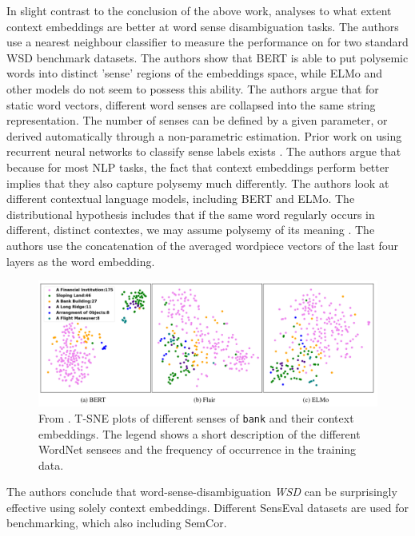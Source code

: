 \documentclass[a4paper,12pt,twoside,openright]{report}
\begin{document}
In slight contrast to the conclusion of the above work, \cite{wiedmann19} analyses to what extent context embeddings are better at word sense disambiguation tasks.
The authors use a nearest neighbour classifier to measure the performance on  for two standard WSD benchmark datasets.
The authors show that BERT is able to put polysemic words into distinct 'sense' regions of the embeddings space, while ELMo and other models do not seem to possess this ability.
The authors argue that for static word vectors, different word senses are collapsed into the same string representation.
The number of senses can be defined by a given parameter, or derived automatically through a non-parametric estimation.
Prior work on using recurrent neural networks to classify sense labels exists \cite{kageback16}.
The authors argue that because for most NLP tasks, the fact that context embeddings perform better implies that they also capture polysemy much differently.
The authors look at different contextual language models, including BERT and ELMo.
The distributional hypothesis includes that if the same word regularly occurs in different, distinct contextes, we may assume polysemy of its meaning \cite{miller91}.
The authors use the concatenation of the averaged wordpiece vectors of the last four layers as the word embedding.

\begin{figure}[h]
	\center
  \includegraphics[width=0.9\linewidth]{./assets/relatedwork/wsd_bert.png}
  \caption{From \cite{wiedmann19}. T-SNE plots of different senses of \texttt{bank} and their context embeddings. The legend shows a short description of the different WordNet sensees and the frequency of occurrence in the training data.
  }
  \label{fig:bert_wsd}
\end{figure}

The authors conclude that word-sense-disambiguation \textit{WSD} can be surprisingly effective using solely context embeddings.
Different SensEval datasets are used for benchmarking, which also including SemCor. \\
\end{document}
